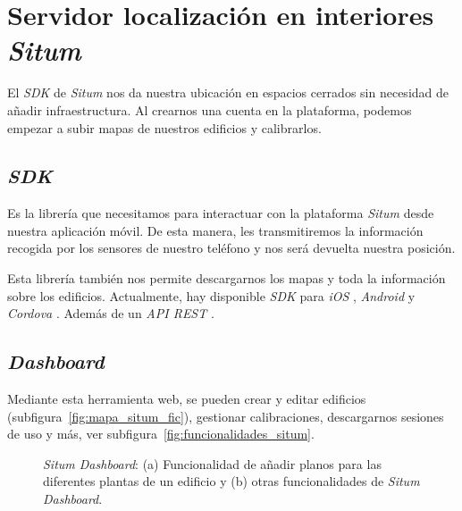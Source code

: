 \section{Servidor localización en interiores \textit{Situm}}
El \textit{SDK} de \textit{Situm} nos da nuestra ubicación en espacios cerrados sin necesidad de añadir infraestructura. Al crearnos una cuenta en la plataforma, podemos empezar a subir mapas de nuestros edificios y calibrarlos.

\subsection{\textit{SDK}}
Es la librería que necesitamos para interactuar con la plataforma \textit{Situm} desde nuestra aplicación móvil. De esta manera, les transmitiremos la información recogida por los sensores de nuestro teléfono y nos será devuelta nuestra posición.

Esta librería también nos permite descargarnos los mapas y toda la información sobre los edificios. Actualmente, hay disponible \textit{SDK} para \textit{iOS} \cite{situm_situm_nodate}, \textit{Android} \cite{situm_situm_nodate-2} y \textit{Cordova} \cite{situm_situm_nodate-1}. Además de un \textit{API REST} \cite{situm_situm_nodate-3}.

\subsection{\textit{Dashboard}}
Mediante esta herramienta web, se pueden crear y editar edificios (subfigura~\ref{fig:mapa_situm_fic}), gestionar calibraciones, descargarnos sesiones de uso y más, ver subfigura~\ref{fig:funcionalidades_situm}.

\begin{figure}[t]
\centering
{}
\caption{\textit{Situm Dashboard}: (a) Funcionalidad de añadir planos para las diferentes plantas de un edificio y (b) otras funcionalidades de \textit{Situm Dashboard}.}
\end{figure}

